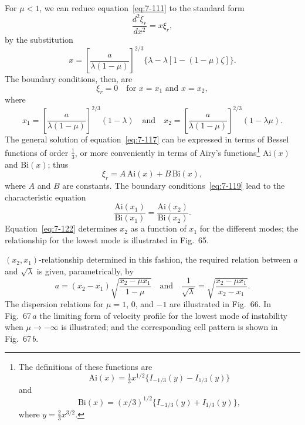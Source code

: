 For $\mu < 1$, we can reduce equation~\eqref{eq:7-111} to the standard form
\begin{equation}
\label{eq:7-117}
\frac{d^2\xi_r}{dx^2} = x\xi_r,
\end{equation}
by the substitution
\begin{equation}
\label{eq:7-118}
x = \left[\frac{a}{\lambda(1-\mu)}\right]^{2/3}\!
\{\lambda - \lambda[1-(1-\mu)\zeta]\}.
\end{equation}
The boundary conditions, then, are
\begin{equation}
\label{eq:7-119}
\xi_r = 0 \quad \text{for } x = x_1 \text{ and } x = x_2,
\end{equation}
where
\begin{equation}
\label{eq:7-120}
x_1 = \left[\frac{a}{\lambda(1-\mu)}\right]^{2/3}\!(1-\lambda)
\quad \text{and} \quad
x_2 = \left[\frac{a}{\lambda(1-\mu)}\right]^{2/3}\!(1-\lambda\mu).
\end{equation}
The general solution of equation~\eqref{eq:7-117} can be expressed in terms of
Bessel functions of order $\frac{1}{3}$, or more conveniently in terms of Airy's
functions\footnote{The definitions of these functions are
\[
\mathrm{Ai}(x) = \tfrac{1}{3}x^{1/2}\{I_{-1/3}(y) - I_{1/3}(y)\}
\]
and
\[
\mathrm{Bi}(x) = (x/3)^{1/2}\{I_{-1/3}(y) + I_{1/3}(y)\},
\]
where $y = \frac{2}{3}x^{3/2}$.} $\mathrm{Ai}(x)$ and $\mathrm{Bi}(x)$; thus
\begin{equation}
\label{eq:7-121}
\xi_r = A\,\mathrm{Ai}(x) + B\,\mathrm{Bi}(x),
\end{equation}
where $A$ and $B$ are constants.  The boundary conditions~\eqref{eq:7-119} lead to
the characteristic equation
\begin{equation}
\label{eq:7-122}
\frac{\mathrm{Ai}(x_1)}{\mathrm{Bi}(x_1)} = \frac{\mathrm{Ai}(x_2)}{\mathrm{Bi}(x_2)}.
\end{equation}
Equation~\eqref{eq:7-122} determines $x_2$ as a function of $x_1$ for the different modes;
the relationship for the lowest mode is illustrated in Fig.~65.


$(x_2,x_1)$-relationship determined in this fashion, the required relation
between $a$ and $\sqrt{\lambda}$ is given, parametrically, by
\begin{equation}
\label{eq:7-123}
a = (x_2-x_1)\sqrt{\frac{x_2-\mu x_1}{1-\mu}}
\quad \text{and} \quad
\frac{1}{\sqrt{\lambda}} = \sqrt{\frac{x_2-\mu x_1}{x_2-x_1}}.
\end{equation}
The dispersion relations for $\mu = 1$, 0, and $-1$ are illustrated in Fig.~66.
In Fig.~67\,$a$ the limiting form of velocity profile for the lowest mode of
instability when $\mu \to -\infty$ is illustrated; and the corresponding cell
pattern is shown in Fig.~67\,$b$.

